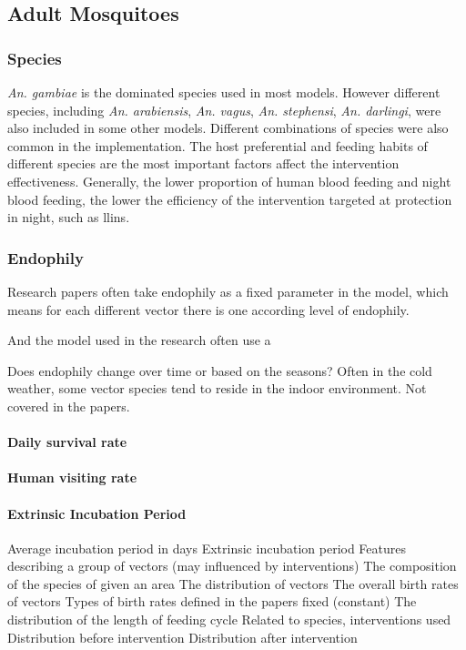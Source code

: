 \documentclass[a4paper, 12pt, twoside]{article}
\begin{document}
\subsection{Adult Mosquitoes}

\subsubsection{Species}
\textit{An. gambiae} is the dominated species used in most models.
However different species, including \textit{An. arabiensis}, \textit{An. vagus}, \textit{An. stephensi}, \textit{An. darlingi}, were also included in some other models.
Different combinations of species were also common in the implementation.
The host preferential and feeding habits of different species are the most important factors affect the intervention effectiveness.
Generally, the lower proportion of human blood feeding and night blood feeding, the lower the efficiency of the intervention targeted at protection in night, such as \gls{llins}.

\subsubsection{Endophily}
Research papers often take endophily as a fixed parameter in the model, which means for each different vector there is one according level of endophily.

And the model used in the research often use a

Does endophily change over time or based on the seasons? Often in the cold weather, some vector species tend to reside in the indoor environment. Not covered in the papers.


\paragraph{Daily survival rate}

\paragraph{Human visiting rate}

\paragraph{Extrinsic Incubation Period}
Average incubation period in days
Extrinsic incubation period
Features describing a group of vectors (may influenced by interventions)
The composition of the species of given an area
The distribution of vectors
The overall birth rates of vectors
Types of birth rates defined in the papers
fixed (constant)
The distribution of the length of feeding cycle
Related to species, interventions used
Distribution before intervention
Distribution after intervention
\end{document}

